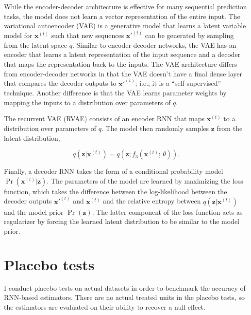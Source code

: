 While the encoder-decoder architecture is effective for many sequential prediction tasks, the model does not learn a vector representation of the entire input. The variational autoencoder (VAE) \citep{kingma2013auto} is a generative model that learns a latent variable model for $\boldsymbol{x}^{(t)}$ such that new sequences $\boldsymbol{x'}^{(t)}$ can be generated by sampling from the latent space $q$. Similar to encoder-decoder networks, the VAE has an encoder that learns a latent representation of the input sequence and a decoder that maps the representation back to the inputs. The VAE architecture differs from encoder-decoder networks in that the VAE doesn't have a final dense layer that compares the decoder outputs to  $\boldsymbol{x'}^{(t)}$; i.e., it is a ``self-supervised'' technique. Another difference is that the VAE learns parameter weights by mapping the inputs to a distribution over parameters of $q$.

The recurrent VAE (RVAE) \citep{fabius2014variational, chung2015recurrent,bowman2015generating} consists of an encoder RNN that maps $\boldsymbol{x}^{(t)}$ to a distribution over parameters of $q$. The model then randomly samples $\boldsymbol{z}$ from the latent distribution, 

\begin{equation}
q(\boldsymbol{z} | \boldsymbol{x}^{(t)}) = q (\boldsymbol{z}; f_3 (\boldsymbol{x}^{(t)};\, \theta)).
\end{equation}

Finally, a decoder RNN takes the form of a conditional probability model $\Pr (\boldsymbol{x}^{(t)} | \boldsymbol{z})$. The parameters of the model are learned by maximizing the loss function, which takes the difference between the log-likelihood between the decoder outputs $\boldsymbol{x'}^{(t)}$ and $\boldsymbol{x}^{(t)}$ and the relative entropy between  $q(\boldsymbol{z} | \boldsymbol{x}^{(t)})$ and the model prior $\Pr (\boldsymbol{z})$. The latter component of the loss function acts as regularizer by forcing the learned latent distribution to be similar to the model prior. 

\section{Placebo tests} \label{placebo}

I conduct placebo tests on actual datasets in order to benchmark the accuracy of RNN-based estimators. There are no actual treated units in the placebo tests, so the estimators are evaluated on their ability to recover a null effect. 

